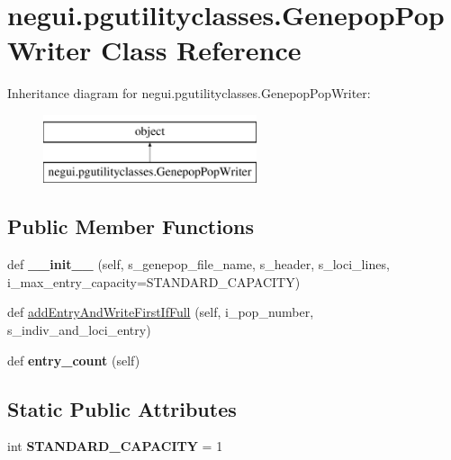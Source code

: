 \hypertarget{classnegui_1_1pgutilityclasses_1_1GenepopPopWriter}{}\section{negui.\+pgutilityclasses.\+Genepop\+Pop\+Writer Class Reference}
\label{classnegui_1_1pgutilityclasses_1_1GenepopPopWriter}
Inheritance diagram for negui.\+pgutilityclasses.\+Genepop\+Pop\+Writer\+:\begin{figure}[H]
\begin{center}
\leavevmode
\includegraphics[height=2.000000cm]{classnegui_1_1pgutilityclasses_1_1GenepopPopWriter}
\end{center}
\end{figure}
\subsection*{Public Member Functions}
\begin{DoxyCompactItemize}
\item 
def {\bfseries \+\_\+\+\_\+init\+\_\+\+\_\+} (self, s\+\_\+genepop\+\_\+file\+\_\+name, s\+\_\+header, s\+\_\+loci\+\_\+lines, i\+\_\+max\+\_\+entry\+\_\+capacity=S\+T\+A\+N\+D\+A\+R\+D\+\_\+\+C\+A\+P\+A\+C\+I\+TY)\hypertarget{classnegui_1_1pgutilityclasses_1_1GenepopPopWriter_ab959b06f8c41bcbc7615144cd1f25ed7}{}\label{classnegui_1_1pgutilityclasses_1_1GenepopPopWriter_ab959b06f8c41bcbc7615144cd1f25ed7}

\item 
def \hyperlink{classnegui_1_1pgutilityclasses_1_1GenepopPopWriter_a5c7d53c68d1c3533ed1fd861f9bd60e4}{add\+Entry\+And\+Write\+First\+If\+Full} (self, i\+\_\+pop\+\_\+number, s\+\_\+indiv\+\_\+and\+\_\+loci\+\_\+entry)
\item 
def {\bfseries entry\+\_\+count} (self)\hypertarget{classnegui_1_1pgutilityclasses_1_1GenepopPopWriter_aed8c87c59012a83d0b8aa02f0c06b8fc}{}\label{classnegui_1_1pgutilityclasses_1_1GenepopPopWriter_aed8c87c59012a83d0b8aa02f0c06b8fc}

\end{DoxyCompactItemize}
\subsection*{Static Public Attributes}
\begin{DoxyCompactItemize}
\item 
int {\bfseries S\+T\+A\+N\+D\+A\+R\+D\+\_\+\+C\+A\+P\+A\+C\+I\+TY} = 1\hypertarget{classnegui_1_1pgutilityclasses_1_1GenepopPopWriter_a079997944121d92a315f774cae76ff22}{}\label{classnegui_1_1pgutilityclasses_1_1GenepopPopWriter_a079997944121d92a315f774cae76ff22}

\end{DoxyCompactItemize}


